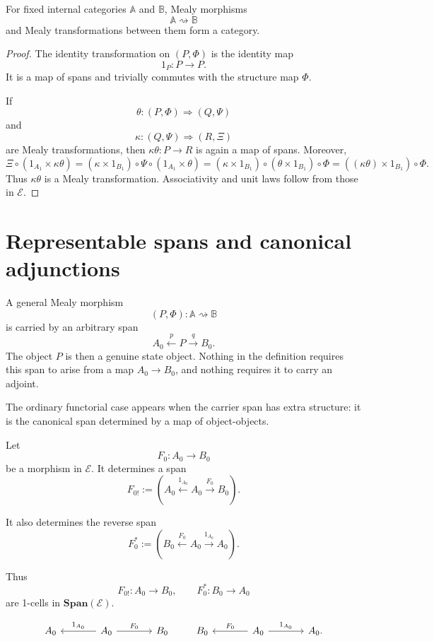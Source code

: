 \begin{proposition}
\label{prop:mealy-transformations-compose}
For fixed internal categories \(\mathbb A\) and \(\mathbb B\), Mealy morphisms
\[
\mathbb A\rightsquigarrow\mathbb B
\]
and Mealy transformations between them form a category.
\end{proposition}

\begin{proof}
The identity transformation on \((P,\Phi)\) is the identity map
\[
1_P:P\to P.
\]
It is a map of spans and trivially commutes with the structure map \(\Phi\).

If
\[
\theta:(P,\Phi)\Rightarrow(Q,\Psi)
\]
and
\[
\kappa:(Q,\Psi)\Rightarrow(R,\Xi)
\]
are Mealy transformations, then \(\kappa\theta:P\to R\) is again a map of spans. Moreover,
\[
\Xi\circ(1_{A_1}\times \kappa\theta)
=
(\kappa\times 1_{B_1})\circ\Psi\circ(1_{A_1}\times\theta)
=
(\kappa\times 1_{B_1})\circ(\theta\times 1_{B_1})\circ\Phi
=
((\kappa\theta)\times 1_{B_1})\circ\Phi.
\]
Thus \(\kappa\theta\) is a Mealy transformation. Associativity and unit laws follow from those in \(\mathcal E\).
\end{proof}

\section{Representable spans and canonical adjunctions}
\label{sec:representable-spans-canonical-adjunctions}

A general Mealy morphism
\[
(P,\Phi):\mathbb A\rightsquigarrow\mathbb B
\]
is carried by an arbitrary span
\[
A_0\xleftarrow{p}P\xrightarrow{q}B_0.
\]
The object \(P\) is then a genuine state object. Nothing in the definition requires this span to arise from a map \(A_0\to B_0\), and nothing requires it to carry an adjoint.

The ordinary functorial case appears when the carrier span has extra structure: it is the canonical span determined by a map of object-objects.

Let
\[
F_0:A_0\to B_0
\]
be a morphism in \(\mathcal E\). It determines a span
\[
F_{0!}
:=
\left(
A_0
\xleftarrow{1_{A_0}}
A_0
\xrightarrow{F_0}
B_0
\right).
\]

It also determines the reverse span
\[
F_0^\ast
:=
\left(
B_0
\xleftarrow{F_0}
A_0
\xrightarrow{1_{A_0}}
A_0
\right).
\]

Thus
\[
F_{0!}:A_0\to B_0,
\qquad
F_0^\ast:B_0\to A_0
\]
are 1-cells in \(\mathbf{Span}(\mathcal E)\).

\[
\begin{tikzcd}[column sep=large]
A_0
&
A_0 \arrow[l, "1_{A_0}"'] \arrow[r, "F_0"]
&
B_0
\end{tikzcd}
\qquad
\begin{tikzcd}[column sep=large]
B_0
&
A_0 \arrow[l, "F_0"'] \arrow[r, "1_{A_0}"]
&
A_0.
\end{tikzcd}
\]

